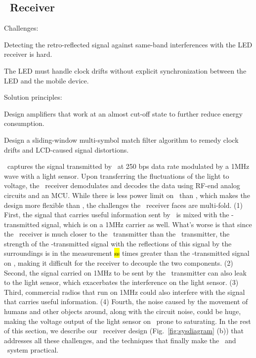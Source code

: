 \subsection{\reader\ Receiver}

Challenges:
\begin{Itemize}
\item Detecting the retro-reflected signal against same-band interferences with the LED receiver is hard.
\item The LED must handle clock drifts without explicit synchronization between the LED and the mobile device.   
\end{Itemize}

Solution principles:
\begin{Itemize}
\item Design amplifiers that work at an almost cut-off state to further reduce energy consumption.
\item Design a sliding-window multi-symbol match filter algorithm to remedy clock drifts and LCD-caused signal distortions.
\end{Itemize}

\reader\ captures the signal transmitted by \vitag\ at 250 bps data rate modulated by a 1MHz wave with a light sensor. Upon transferring the fluctuations of the light to voltage, the \reader\ receiver demodulates and decodes the data using RF-end analog circuits and an MCU. While there is less power limit on \reader\ than \vitag, which makes the design more flexible than \vitag, the challenges the \reader\ receiver faces are multi-fold. (1) First, the signal that carries useful information sent by \vitag\ is mixed with the \reader-transmitted signal, which is on a 1MHz carrier as well. What's worse is that since the \reader\ receiver is much closer to the \reader\ transmitter than the \vitag\ transmitter, the strength of the \reader-transmitted signal with the reflections of this signal by the surroundings is in the measurement \hl{ss} times greater than the \vitag-transmitted signal on \reader, making it difficult for the \reader receiver to decouple the two components. (2) Second, the signal carried on 1MHz to be sent by the \reader\ transmitter can also leak to the light sensor, which exacerbates the interference on the light sensor. (3) Third, commercial radios that run on 1MHz could also interfere with the signal that carries useful information. (4) Fourth, the noise caused by the movement of humans and other objects around, along with the circuit noise, could be huge, making the voltage output of the light sensor on \reader\ prone to saturating. In the rest of this section, we describe our \reader\ receiver design (Fig.~\ref{fig:sysdiagram} (b)) that addresses all these challenges, and the techniques that finally make the \vitag\ and \reader\ system practical.

